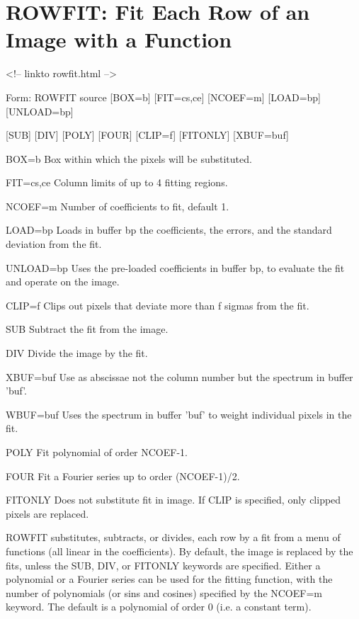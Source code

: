 \section{ROWFIT: Fit Each Row of an Image with a Function}
\begin{rawhtml}
<!-- linkto rowfit.html -->
\end{rawhtml}
\begin{command}
  \item[Form: ROWFIT source {[BOX=b]} {[FIT=cs,ce]} {[NCOEF=m]} {[LOAD=bp]} 
       {[UNLOAD=bp]}\hfill]{}
  \item{{[SUB]} {[DIV]} {[POLY]} {[FOUR]} {[CLIP=f]} {[FITONLY]} {[XBUF=buf]}}
  \item[BOX=b]{Box within which the pixels will be substituted.}
  \item[FIT=cs,ce]{Column limits of up to 4 fitting regions.}
  \item[NCOEF=m]{Number of coefficients to fit, default 1.}
  \item[LOAD=bp]{Loads in buffer bp the coefficients, the errors,
       and the standard deviation from the fit.}
  \item[UNLOAD=bp]{Uses the pre-loaded coefficients in buffer bp,  
       to evaluate the fit and operate on the image.}
  \item[CLIP=f]{Clips out pixels that deviate more than f sigmas from
       the fit.}
  \item[SUB]{Subtract the fit from the image.}
  \item[DIV]{Divide the image by the fit.}
  \item[XBUF=buf]{Use as abscissae not the column number but the spectrum  
       in buffer 'buf'.}
  \item[WBUF=buf]{Uses the spectrum in buffer 'buf' to weight individual
   pixels in the fit.}
  \item[POLY]{Fit polynomial of order NCOEF-1.}
  \item[FOUR]{Fit a Fourier series up to order (NCOEF-1)/2.}
  \item[FITONLY]{Does not substitute fit in image. If CLIP is specified,
       only clipped pixels are replaced.}
\end{command}

ROWFIT substitutes, subtracts, or divides, each row by a fit from a menu
of functions (all linear in the coefficients). By default, the image is
replaced by the fits, unless the SUB, DIV, or FITONLY keywords are
specified.  Either a polynomial or a Fourier series can be used for the
fitting function, with the number of polynomials (or sins and cosines)
specified by the NCOEF=m keyword. The default is a polynomial of order 0
(i.e. a constant term).

